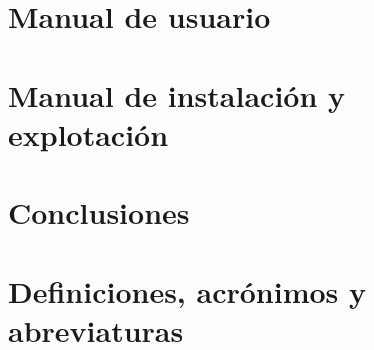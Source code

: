 \documentclass[a4paper,11pt]{book}
\begin{document}
\chapter{Manual de usuario}


\chapter{Manual de instalación y explotación}


\chapter{Conclusiones}



\nocite{*}
{}


\backmatter

\chapter{Definiciones, acrónimos y abreviaturas}


%

\end{document}
